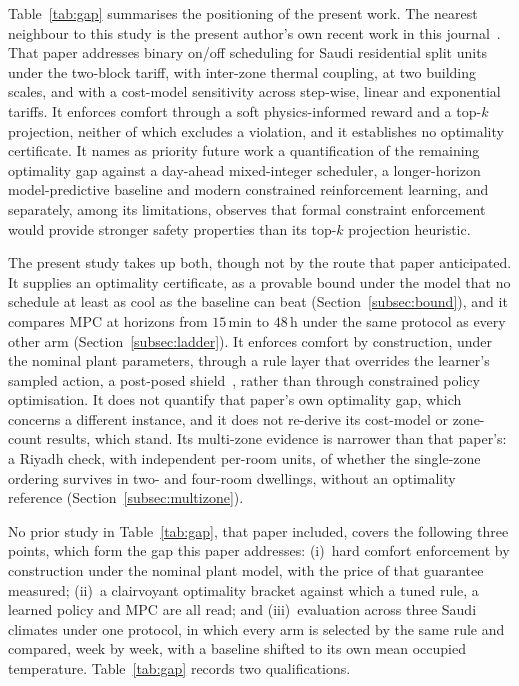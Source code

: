 \documentclass[3p,twocolumn,number]{elsarticle}
\begin{document}
Table~\ref{tab:gap} summarises the positioning of the present work. The nearest neighbour to this study is the present author's own recent work in this journal~\cite{Faraj2026}. That paper addresses binary on/off scheduling for Saudi residential split units under the two-block tariff, with inter-zone thermal coupling, at two building scales, and with a cost-model sensitivity across step-wise, linear and exponential tariffs. It enforces comfort through a soft physics-informed reward and a top-$k$ projection, neither of which excludes a violation, and it establishes no optimality certificate. It names as priority future work a quantification of the remaining optimality gap against a day-ahead mixed-integer scheduler, a longer-horizon model-predictive baseline and modern constrained reinforcement learning, and separately, among its limitations, observes that formal constraint enforcement would provide stronger safety properties than its top-$k$ projection heuristic.

The present study takes up both, though not by the route that paper anticipated. It supplies an optimality certificate, as a provable bound under the model that no schedule at least as cool as the baseline can beat (Section~\ref{subsec:bound}), and it compares MPC at horizons from $15\,$min to $48\,$h under the same protocol as every other arm (Section~\ref{subsec:ladder}). It enforces comfort by construction, under the nominal plant parameters, through a rule layer that overrides the learner's sampled action, a post-posed shield~\cite{Alshiekh2018}, rather than through constrained policy optimisation. It does not quantify that paper's own optimality gap, which concerns a different instance, and it does not re-derive its cost-model or zone-count results, which stand. Its multi-zone evidence is narrower than that paper's: a Riyadh check, with independent per-room units, of whether the single-zone ordering survives in two- and four-room dwellings, without an optimality reference (Section~\ref{subsec:multizone}).

No prior study in Table~\ref{tab:gap}, that paper included, covers the following three points, which form the gap this paper addresses: (i)~hard comfort enforcement by construction under the nominal plant model, with the price of that guarantee measured; (ii)~a clairvoyant optimality bracket against which a tuned rule, a learned policy and MPC are all read; and (iii)~evaluation across three Saudi climates under one protocol, in which every arm is selected by the same rule and compared, week by week, with a baseline shifted to its own mean occupied temperature. Table~\ref{tab:gap} records two qualifications.
 
\end{document}
